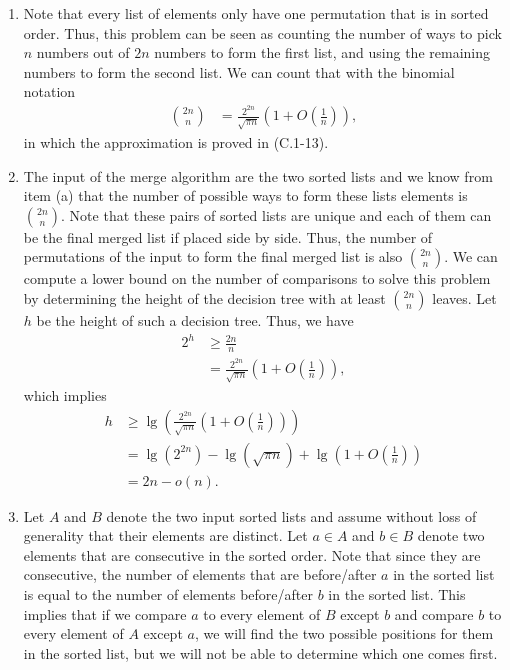 \begin{enumerate}
\begin{framed}
\begin{enumerate}
\item Note that every list of elements only have one permutation that is in
sorted order. Thus, this problem can be seen as counting the number of ways to
pick $n$ numbers out of $2n$ numbers to form the first list, and using the
remaining numbers to form the second list. We can count that with the binomial
notation
\begin{equation*}
\begin{aligned}
  \binom{2n}{n} &= \frac{2^{2n}}{\sqrt{\pi n}} \left( 1 + O\left(\frac{1}{n}\right) \right),
\end{aligned}
\end{equation*}
in which the approximation is proved in (C.1-13).
\item The input of the merge algorithm are the two sorted lists and we know from
item (a) that the number of possible ways to form these lists elements is
$\binom{2n}{n}$. Note that these pairs of sorted lists are unique and each of
them can be the final merged list if placed side by side. Thus, the number of
permutations of the input to form the final merged list is also $\binom{2n}{n}$.
We can compute a lower bound on the number of comparisons to solve this problem
by determining the height of the decision tree with at least $\binom{2n}{n}$
leaves. Let $h$ be the height of such a decision tree. Thus, we have
\begin{equation*}
\begin{aligned}
  2^h &\ge \frac{2n}{n}\\
      &=   \frac{2^{2n}}{\sqrt{\pi n}} \left( 1 + O\left(\frac{1}{n}\right) \right),
\end{aligned}
\end{equation*}
which implies
\begin{equation*}
\begin{aligned}
  h &\ge \lg \left( \frac{2^{2n}}{\sqrt{\pi n}} \left(1 + O\left( \frac{1}{n} \right) \right) \right)\\
    &=   \lg (2^{2n}) - \lg(\sqrt{\pi n}) + \lg\left(1 + O\left( \frac{1}{n} \right)\right)\\
    &=   2n - o(n).
\end{aligned}
\end{equation*}

\item Let $A$ and $B$ denote the two input sorted lists and assume without loss
of generality that their elements are distinct. Let $a \in A$ and $b \in B$
denote two elements that are consecutive in the sorted order. Note that since
they are consecutive, the number of elements that are before/after $a$ in the
sorted list is equal to the number of elements before/after $b$ in the sorted
list. This implies that if we compare $a$ to every element of $B$ except $b$ and
compare $b$ to every element of $A$ except $a$, we will find the two possible
positions for them in the sorted list, but we will not be able to determine
which one comes first.


\end{enumerate}
\end{framed}
\end{enumerate}
